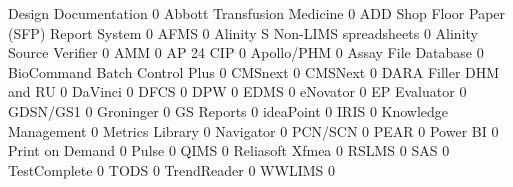 \documentclass{article}
\begin{document}
\begin{Schunk}
\begin{Soutput}
                                           Design Documentation
                                                              0
  Abbott Transfusion Medicine                                 0
  ADD Shop Floor Paper (SFP) Report System                    0
  AFMS                                                        0
  Alinity S Non-LIMS spreadsheets                             0
  Alinity Source Verifier                                     0
  AMM                                                         0
  AP 24 CIP                                                   0
  Apollo/PHM                                                  0
  Assay File Database                                         0
  BioCommand Batch Control Plus                               0
  CMSnext                                                     0
  CMSNext                                                     0
  DARA Filler DHM and RU                                      0
  DaVinci                                                     0
  DFCS                                                        0
  DPW                                                         0
  EDMS                                                        0
  eNovator                                                    0
  EP Evaluator                                                0
  GDSN/GS1                                                    0
  Groninger                                                   0
  GS Reports                                                  0
  ideaPoint                                                   0
  IRIS                                                        0
  Knowledge Management                                        0
  Metrics Library                                             0
  Navigator                                                   0
  PCN/SCN                                                     0
  PEAR                                                        0
  Power BI                                                    0
  Print on Demand                                             0
  Pulse                                                       0
  QIMS                                                        0
  Reliasoft Xfmea                                             0
  RSLMS                                                       0
  SAS                                                         0
  TestComplete                                                0
  TODS                                                        0
  TrendReader                                                 0
  WWLIMS                                                      0
                                          

\end{Soutput}
\end{Schunk}
\end{document}
